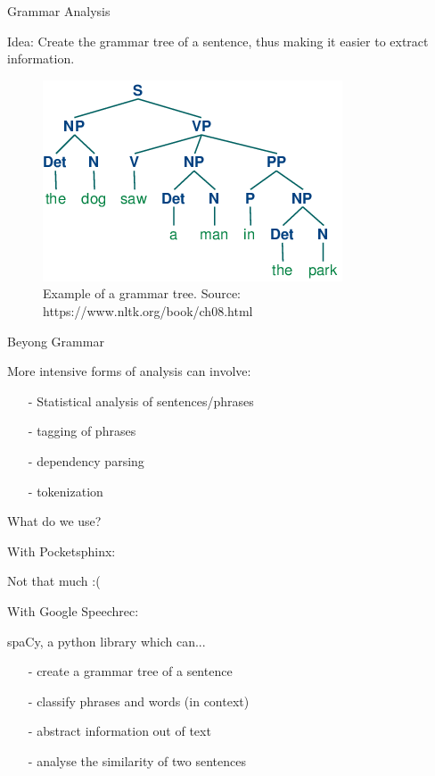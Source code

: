 \documentclass{beamer}
\begin{document}
	\begin{frame}{Grammar Analysis}
		\begin{alertblock}{Idea: Create the grammar tree of a sentence, thus making it easier to extract information.}
		\end{alertblock}
		
		\begin{figure}[ht]
			\centering
			\includegraphics[width=.7\linewidth]{Bilder/grammar_tree.png}
			\caption{Example of a grammar tree. Source: https://www.nltk.org/book/ch08.html}
		\end{figure}
		
	\end{frame}
	
	\begin{frame}{Beyong Grammar}
		\begin{alertblock}{More intensive forms of analysis can involve:}
			\begin{itemize}
				\item[-] Statistical analysis of sentences/phrases
				\item[-] tagging of phrases
				\item[-] dependency parsing
				\item[-] tokenization
			\end{itemize} 
		\end{alertblock}
	\end{frame}
	
	\begin{frame}{What do we use?}
		\begin{alertblock}{With Pocketsphinx:}
		
			\pause
			Not that much :(
		\end{alertblock}
		
		\begin{alertblock}{With Google Speechrec:}
		
			\pause
			spaCy, a python library which can...
			\begin{itemize}
				\item[-] create a grammar tree of a sentence
				\item[-] classify phrases and words (in context)
				\item[-] abstract information out of text
				\item[-] analyse the similarity of two sentences
			\end{itemize}
		\end{alertblock}
	\end{frame}
	
\end{document}

